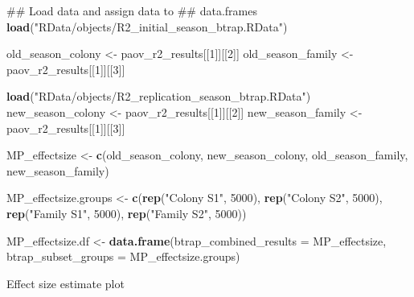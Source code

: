 \documentclass[]{article}
\newenvironment{Shaded}{\begin{snugshade}}{\end{snugshade}}
\newcommand{\KeywordTok}[1]{\textcolor[rgb]{0.13,0.29,0.53}{\textbf{#1}}}
\newcommand{\DataTypeTok}[1]{\textcolor[rgb]{0.13,0.29,0.53}{#1}}
\newcommand{\DecValTok}[1]{\textcolor[rgb]{0.00,0.00,0.81}{#1}}
\newcommand{\StringTok}[1]{\textcolor[rgb]{0.31,0.60,0.02}{#1}}
\newcommand{\NormalTok}[1]{#1}
\begin{document}
\begin{Shaded}
\begin{Highlighting}[]
\NormalTok{## Load data and assign data to}
\NormalTok{## data.frames}
\KeywordTok{load}\NormalTok{(}\StringTok{"RData/objects/R2_initial_season_btrap.RData"}\NormalTok{)}

\NormalTok{old_season_colony <-}\StringTok{ }\NormalTok{paov_r2_results[[}\DecValTok{1}\NormalTok{]][[}\DecValTok{2}\NormalTok{]]}
\NormalTok{old_season_family <-}\StringTok{ }\NormalTok{paov_r2_results[[}\DecValTok{1}\NormalTok{]][[}\DecValTok{3}\NormalTok{]]}

\KeywordTok{load}\NormalTok{(}\StringTok{"RData/objects/R2_replication_season_btrap.RData"}\NormalTok{)}
\NormalTok{new_season_colony <-}\StringTok{ }\NormalTok{paov_r2_results[[}\DecValTok{1}\NormalTok{]][[}\DecValTok{2}\NormalTok{]]}
\NormalTok{new_season_family <-}\StringTok{ }\NormalTok{paov_r2_results[[}\DecValTok{1}\NormalTok{]][[}\DecValTok{3}\NormalTok{]]}

\NormalTok{MP_effectsize <-}\StringTok{ }\KeywordTok{c}\NormalTok{(old_season_colony, new_season_colony, }
\NormalTok{    old_season_family, new_season_family)}

\NormalTok{MP_effectsize.groups <-}\StringTok{ }\KeywordTok{c}\NormalTok{(}\KeywordTok{rep}\NormalTok{(}\StringTok{"Colony S1"}\NormalTok{, }
    \DecValTok{5000}\NormalTok{), }\KeywordTok{rep}\NormalTok{(}\StringTok{"Colony S2"}\NormalTok{, }\DecValTok{5000}\NormalTok{), }\KeywordTok{rep}\NormalTok{(}\StringTok{"Family S1"}\NormalTok{, }
    \DecValTok{5000}\NormalTok{), }\KeywordTok{rep}\NormalTok{(}\StringTok{"Family S2"}\NormalTok{, }\DecValTok{5000}\NormalTok{))}

\NormalTok{MP_effectsize.df <-}\StringTok{ }\KeywordTok{data.frame}\NormalTok{(}\DataTypeTok{btrap_combined_results =}\NormalTok{ MP_effectsize, }
    \DataTypeTok{btrap_subset_groups =}\NormalTok{ MP_effectsize.groups)}
\end{Highlighting}
\end{Shaded}

Effect size estimate plot
\end{document}
